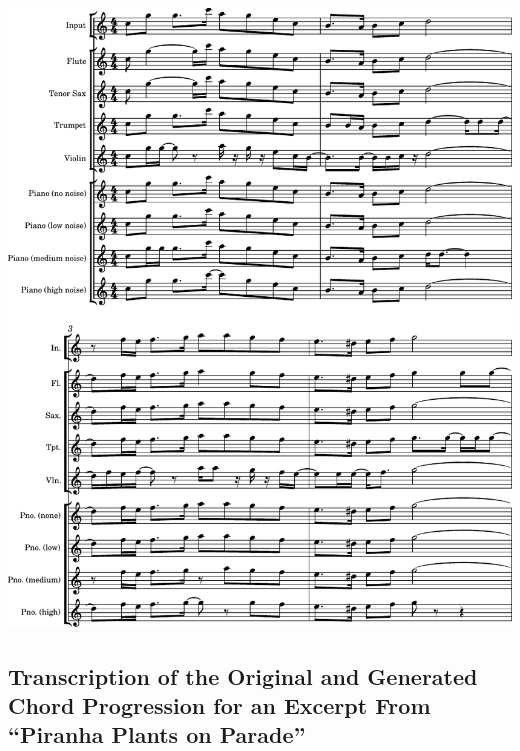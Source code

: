 \includegraphics[page=2, width=\linewidth]{materials/piranha_melody.pdf}
\clearpage

\clearpage
\subsection{Transcription of the Original and Generated Chord Progression for an Excerpt From ``Piranha Plants on Parade''}
\label{sec:sheet_music_melody}

